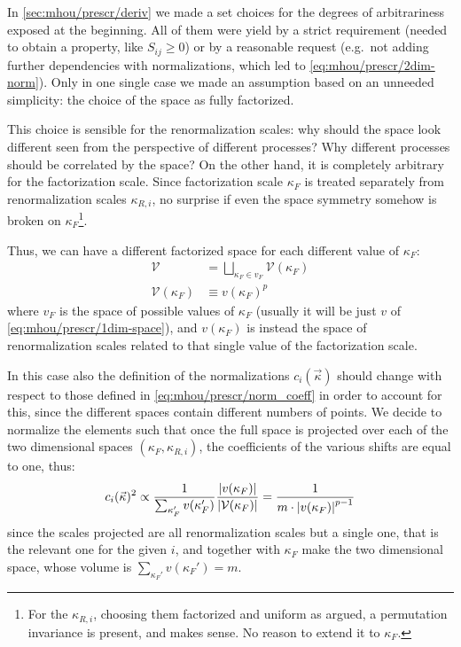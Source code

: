 
In \cref{sec:mhou/prescr/deriv} we made a set choices for the degrees of
arbitrariness exposed at the beginning.
All of them were yield by a strict requirement (needed to obtain a property,
like $S_{ij} \ge 0$) or by a reasonable request (e.g.\ not adding further
dependencies with normalizations, which led to \cref{eq:mhou/prescr/2dim-norm}).
Only in one single case we made an assumption based on an unneeded simplicity:
the choice of the space as fully factorized.

This choice is sensible for the renormalization scales: why should the space
look different seen from the perspective of different processes? Why different
processes should be correlated by the space?
On the other hand, it is completely arbitrary for the factorization scale.
Since factorization scale $\kappa_F$ is treated separately from renormalization
scales $\kappa_{R,i}$, no surprise if even the space symmetry somehow is broken
on $\kappa_F$\footnote{
    For the $\kappa_{R,i}$, choosing them factorized and uniform as argued, a
    permutation invariance is present, and makes sense.
    No reason to extend it to $\kappa_F$.
}.

Thus, we can have a different factorized space for each different value of $\kappa_F$:
\begin{align}
    \label{eq:mhou/prescr/sliced-space}
    \mathcal{V} &= \bigsqcup_{\kappa_F \in v_F} \mathcal{V}(\kappa_F)\\
    \label{eq:mhou/prescr/1f-factorized}
    \mathcal{V}(\kappa_F) &\equiv v(\kappa_F)^p
\end{align}
where $v_F$ is the space of possible values of $\kappa_F$ (usually it will be
just $v$ of \cref{eq:mhou/prescr/1dim-space}), and $v(\kappa_F)$ is instead the space of
renormalization scales related to that single value of the factorization scale.

In this case also the definition of the normalizations $c_i(\vec{\kappa})$
should change with respect to those defined in \cref{eq:mhou/prescr/norm_coeff} in order to
account for this, since the different spaces contain different numbers of
points.
We decide to normalize the elements such that once the full space is projected
over each of the two dimensional spaces $(\kappa_F, \kappa_{R,i})$, the
coefficients of the various shifts are equal to one, thus:
\begin{equation}
    \label{eq:mhou/prescr/sliced-norm}
    c_i(\vec{\kappa})^2 \propto \frac{1}{\sum_{\kappa_F'}v(\kappa_F')} \frac{\abs{v(\kappa_F)}}{\abs{\mathcal{V}(\kappa_F)}}
        = \frac{1}{m \cdot \abs{v(\kappa_F)}^{p-1}}
\end{equation}
since the scales projected are all renormalization scales but a single one,
that is the relevant one for the given $i$, and together with $\kappa_F$ make
the two dimensional space, whose volume is $\sum_{\kappa_F'}v(\kappa_F') = m$.
